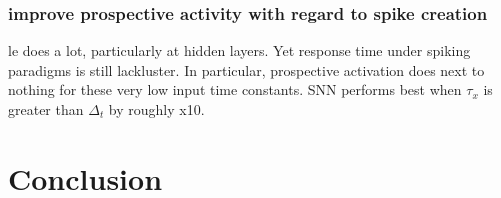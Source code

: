 \subsubsection{improve prospective activity with regard to spike creation}

le does a lot, particularly at hidden layers. Yet response time under spiking paradigms is still
lackluster. In particular, prospective activation does next to nothing for these very low input time
constants. SNN performs best when $\tau_x$ is greater than $\Delta_t$ by roughly x10.









\section{Conclusion}